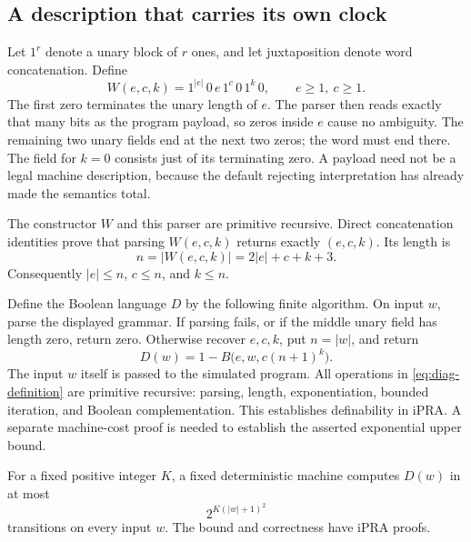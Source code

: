 \subsection{A description that carries its own clock}

Let \(1^r\) denote a unary block of \(r\) ones, and let juxtaposition denote
word concatenation.  Define
\begin{equation}
  W(e,c,k)=1^{|e|}\,0\,e\,1^c\,0\,1^k\,0,
  \qquad e\ge1,\ c\geq1.
  \label{eq:self-description}
\end{equation}
The first zero terminates the unary length of \(e\).  The parser then reads
exactly that many bits as the program payload, so zeros inside \(e\) cause no
ambiguity.  The remaining two unary fields end at the next two zeros; the
word must end there.  The field for \(k=0\) consists just of its terminating
zero.  A payload need not be a legal machine description, because the default
rejecting interpretation has already made the semantics total.

The constructor \(W\) and this parser are primitive recursive.  Direct
concatenation identities prove that parsing \(W(e,c,k)\) returns exactly
\((e,c,k)\).  Its length is
\begin{equation}
  n=|W(e,c,k)|=2|e|+c+k+3.
  \label{eq:diag-length}
\end{equation}
Consequently \(|e|\leq n\), \(c\leq n\), and \(k\leq n\).

Define the Boolean language \(D\) by the following finite algorithm.  On
input \(w\), parse the displayed grammar.  If parsing fails, or if the middle
unary field has length zero, return zero.  Otherwise recover \(e,c,k\), put
\(n=|w|\), and return
\begin{equation}
  D(w)=1-B\bigl(e,w,c(n+1)^k\bigr).
  \label{eq:diag-definition}
\end{equation}
The input \(w\) itself is passed to the simulated program.  All operations
in \eqref{eq:diag-definition} are primitive recursive: parsing, length, exponentiation, bounded
iteration, and Boolean complementation.  This establishes definability in
iPRA.  A separate machine-cost proof is needed to establish the asserted
exponential upper bound.

\begin{lemma}
\label{lem:diagonal-exp}
For a fixed positive integer \(K\), a fixed deterministic machine computes
\(D(w)\) in at most
\[
  2^{K(|w|+1)^2}
\]
transitions on every input \(w\).  The bound and correctness have iPRA proofs.
\end{lemma}

